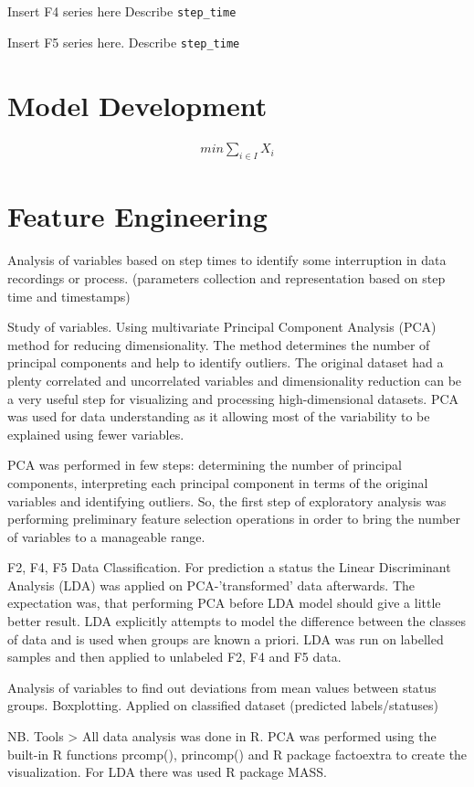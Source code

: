 \documentclass{article}
\begin{document}
Insert F4 series here
Describe \texttt{step\_time}

Insert F5 series here.
Describe \texttt{step\_time}

\section{Model Development}
\begin{align}
    min \sum_{i \in I}{X_i}    
\end{align}

\section{Feature Engineering}
Analysis of variables based on step times to identify some interruption in data recordings or process.  (parameters collection and representation based on step time and timestamps)

Study of variables. Using multivariate Principal Component Analysis (PCA) method for reducing dimensionality. The method determines the number of principal components and help to identify outliers. The original dataset had a plenty correlated and uncorrelated variables and dimensionality reduction can be a very useful step for visualizing and processing high-dimensional datasets.  PCA was used for data understanding as it allowing most of the variability to be explained using fewer variables.

 PCA was performed in few steps: determining the number of principal components, interpreting each principal component in terms of the original variables and identifying outliers. So, the first step of exploratory analysis was performing preliminary feature selection operations in order to bring the number of variables to a manageable range.
 
 F2, F4, F5 Data Classification.  For prediction a status the Linear Discriminant Analysis (LDA) was applied on PCA-’transformed’ data afterwards. The expectation was, that performing PCA before LDA model should give a little better result. LDA explicitly attempts to model the difference between the classes of data and is used when groups are known a priori.  LDA was run on labelled samples and then applied to unlabeled F2, F4 and F5 data.
 
 Analysis of variables to find out deviations from mean values between status groups. Boxplotting.  Applied on classified dataset (predicted labels/statuses) 

NB. Tools > All data analysis was done in R. PCA was performed using the built-in R functions prcomp(), princomp() and R package factoextra to create the visualization. For LDA there was used R package MASS. 







\listoffigures

\appendix

\end{document}
